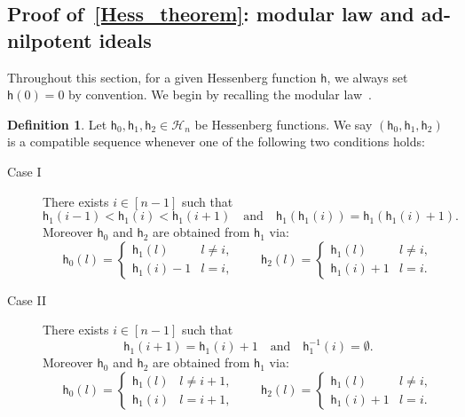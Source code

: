 \documentclass[12pt,a4paper,reqno]{amsart}
\theoremstyle{plain}
\theoremstyle{definition}
\newtheorem{definition}[theorem]{Definition}
\newcommand{\1}{\mathds{1}}
\newcommand{\hes}{\mathsf{h}}
\begin{document}
\subsection{
Proof of~\cref{Hess_theorem}:  modular law and ad-nilpotent ideals}
\label{subsec:modular}
Throughout this section, for a given Hessenberg function $\hes$, we always set $\hes(0)=0$ by convention. We begin by recalling the modular law~\cite{Abreu-Nigro}. 
\begin{definition}\label{triple_cond} Let $\hes_0, \hes_1, \hes_2 \in \mathcal{H}_n$ be Hessenberg functions. We say $(\hes_0,\hes_1,\hes_2)$ is a compatible sequence whenever one of the following two conditions holds:

\begin{description}
\item[Case I] There exists $i \in [n-1]$ such that 
\begin{equation}\label{caseI_h}
\hes_1(i-1) < \hes_1(i) < \hes_1(i+1)\quad \text{and}\quad \hes_1(\hes_1(i)) = \hes_1(\hes_1(i)+1).
\end{equation}
Moreover $\hes_0$ and $\hes_2$ are obtained from $\hes_1$ via:
\begin{equation}\label{caseI_modular}
\hes_0(l)= 
\begin{cases}
\hes_1(l) &  l \neq i, \\
\hes_1(i) - 1 &  l = i,
\end{cases} \qquad
\hes_2(l) = 
\begin{cases}
\hes_1(l) & l \neq i, \\
\hes_1(i) + 1 & l = i.
\end{cases}
\end{equation}
\medskip

\item[Case II] There exists $i \in [n-1]$ such that 
\begin{equation}\label{caseII_h}
\hes_1(i+1) = \hes_1(i)+1\quad \text{and}\quad \hes_1^{-1}(i) = \emptyset.
\end{equation}
Moreover $\hes_0$ and $\hes_2$ are obtained from $\hes_1$ via:
\begin{equation}\label{caseII_modular}
\hes_0(l) = 
\begin{cases}
\hes_1(l) &  l \neq i+1, \\
\hes_1(i) &  l = i+1,
\end{cases} \qquad
\hes_2(l) = 
\begin{cases}
\hes_1(l) & l \neq i, \\
\hes_1(i)+1 &  l= i.
\end{cases}
\end{equation}
\end{description}
\end{definition}
\end{document}
